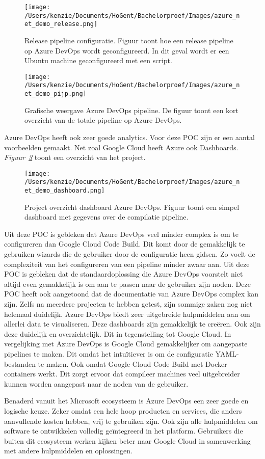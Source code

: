 \begin{figure}[!htbp]
    \centering
    \texttt{[image: /Users/kenzie/Documents/HoGent/Bachelorproef/Images/azure\_net\_demo\_release.png]}
    \caption{Release pipeline configuratie. Figuur toont hoe een release pipeline op Azure DevOps wordt geconfigureerd. In dit geval wordt er een Ubuntu machine geconfigureerd met een script.}
    \label{fig:Azure_POC_release}
\end{figure}

\begin{figure}[!htbp]
    \centering
    \texttt{[image: /Users/kenzie/Documents/HoGent/Bachelorproef/Images/azure\_net\_demo\_pijp.png]}
    \caption{Grafische weergave Azure DevOps pipeline. De figuur toont een kort overzicht van de totale pipeline op Azure DevOps.}
    \label{fig:Azure_POC_pijp}
\end{figure}

Azure DevOps heeft ook zeer goede analytics. Voor deze POC zijn er een aantal voorbeelden gemaakt. Net zoal Google Cloud heeft Azure ook Dashboards. \emph{Figuur~\ref{fig:Azure_POC_dashboard}} toont een overzicht van het project.

\begin{figure}[!htbp]
    \centering
    \texttt{[image: /Users/kenzie/Documents/HoGent/Bachelorproef/Images/azure\_net\_demo\_dashboard.png]}
    \caption{Project overzicht dashboard Azure DevOps. Figuur toont een simpel dashboard met gegevens over de compilatie pipeline.}
    \label{fig:Azure_POC_dashboard}
\end{figure}

Uit deze POC is gebleken dat Azure DevOps veel minder complex is om te configureren dan Google Cloud Code Build. Dit komt door de gemakkelijk te gebruiken wizards die de gebruiker door de configuratie heen gidsen. Zo voelt de complexiteit van het configureren van een pipeline minder zwaar aan. Uit deze POC is gebleken dat de standaardoplossing die Azure DevOps voorstelt niet altijd even gemakkelijk is om aan te passen naar de gebruiker zijn noden. Deze POC heeft ook aangetoond dat de documentatie van Azure DevOps complex kan zijn. Zelfs na meerdere projecten te hebben getest, zijn sommige zaken nog niet helemaal duidelijk. Azure DevOps biedt zeer uitgebreide hulpmiddelen aan om allerlei data te visualiseren. Deze dashboards zijn gemakkelijk te creëren. Ook zijn deze duidelijk en overzichtelijk. Dit in tegenstelling tot Google Cloud. In vergelijking met Azure DevOps is Google Cloud gemakkelijker om aangepaste pipelines te maken. Dit omdat het intuïtiever is om de configuratie YAML-bestanden te maken. Ook omdat Google Cloud Code Build met Docker containers werkt. Dit zorgt ervoor dat compileer machines veel uitgebreider kunnen worden aangepast naar de noden van de gebruiker.

Benaderd vanuit het Microsoft ecosysteem is Azure DevOps een zeer goede en logische keuze. Zeker omdat een hele hoop producten en services, die anders aanvullende kosten hebben, vrij te gebruiken zijn. Ook zijn alle hulpmiddelen om software te ontwikkelen volledig geïntegreerd in het platform. Gebruikers die buiten dit ecosysteem werken kijken beter naar Google Cloud in samenwerking met andere hulpmiddelen en oplossingen.